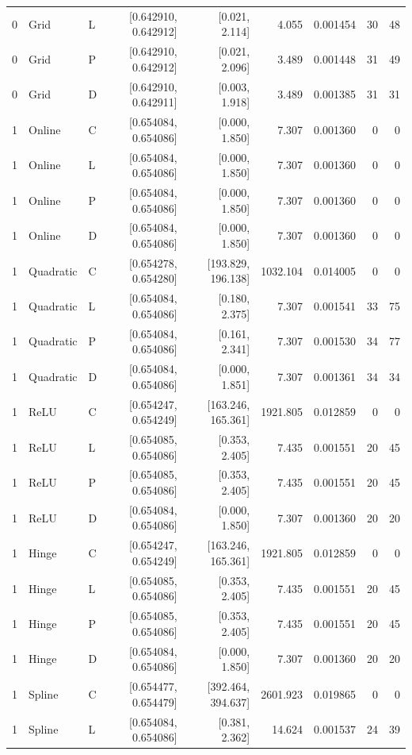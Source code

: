 \begin{longtable}{lllrrrrrr}
0 & Grid & L & [0.642910, 0.642912] & [0.021, 2.114] & 4.055 & 0.001454 & 30 & 48 \\
0 & Grid & P & [0.642910, 0.642912] & [0.021, 2.096] & 3.489 & 0.001448 & 31 & 49 \\
0 & Grid & D & [0.642910, 0.642911] & [0.003, 1.918] & 3.489 & 0.001385 & 31 & 31 \\
1 & Online & C & [0.654084, 0.654086] & [0.000, 1.850] & 7.307 & 0.001360 & 0 & 0 \\
1 & Online & L & [0.654084, 0.654086] & [0.000, 1.850] & 7.307 & 0.001360 & 0 & 0 \\
1 & Online & P & [0.654084, 0.654086] & [0.000, 1.850] & 7.307 & 0.001360 & 0 & 0 \\
1 & Online & D & [0.654084, 0.654086] & [0.000, 1.850] & 7.307 & 0.001360 & 0 & 0 \\
1 & Quadratic & C & [0.654278, 0.654280] & [193.829, 196.138] & 1032.104 & 0.014005 & 0 & 0 \\
1 & Quadratic & L & [0.654084, 0.654086] & [0.180, 2.375] & 7.307 & 0.001541 & 33 & 75 \\
1 & Quadratic & P & [0.654084, 0.654086] & [0.161, 2.341] & 7.307 & 0.001530 & 34 & 77 \\
1 & Quadratic & D & [0.654084, 0.654086] & [0.000, 1.851] & 7.307 & 0.001361 & 34 & 34 \\
1 & ReLU & C & [0.654247, 0.654249] & [163.246, 165.361] & 1921.805 & 0.012859 & 0 & 0 \\
1 & ReLU & L & [0.654085, 0.654086] & [0.353, 2.405] & 7.435 & 0.001551 & 20 & 45 \\
1 & ReLU & P & [0.654085, 0.654086] & [0.353, 2.405] & 7.435 & 0.001551 & 20 & 45 \\
1 & ReLU & D & [0.654084, 0.654086] & [0.000, 1.850] & 7.307 & 0.001360 & 20 & 20 \\
1 & Hinge & C & [0.654247, 0.654249] & [163.246, 165.361] & 1921.805 & 0.012859 & 0 & 0 \\
1 & Hinge & L & [0.654085, 0.654086] & [0.353, 2.405] & 7.435 & 0.001551 & 20 & 45 \\
1 & Hinge & P & [0.654085, 0.654086] & [0.353, 2.405] & 7.435 & 0.001551 & 20 & 45 \\
1 & Hinge & D & [0.654084, 0.654086] & [0.000, 1.850] & 7.307 & 0.001360 & 20 & 20 \\
1 & Spline & C & [0.654477, 0.654479] & [392.464, 394.637] & 2601.923 & 0.019865 & 0 & 0 \\
1 & Spline & L & [0.654084, 0.654086] & [0.381, 2.362] & 14.624 & 0.001537 & 24 & 39 \\

\end{longtable}
